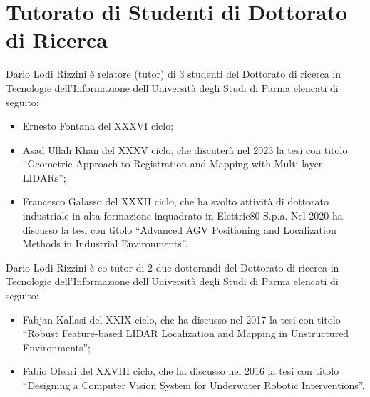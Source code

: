 \documentclass[11pt]{article}
\begin{document}
\section*{Tutorato di Studenti di Dottorato di Ricerca}

Dario Lodi Rizzini \`e relatore (tutor) di 3 studenti del Dottorato di ricerca in Tecnologie dell'Informazione dell'Universit\`a degli Studi di Parma elencati di seguito:
\begin{itemize}
\item Ernesto Fontana del XXXVI ciclo;
\item Asad Ullah Khan del XXXV ciclo, che discuterà nel 2023 la tesi con titolo ``Geometric Approach to Registration and Mapping with Multi-layer LIDARs'';
\item Francesco Galasso del XXXII ciclo, che ha svolto attivit\`a di dottorato industriale in alta formazione inquadrato in Elettric80 S.p.a. 
  Nel 2020 ha discusso la tesi con titolo ``Advanced AGV Positioning and Localization Methods in Industrial Environments''.
\end{itemize}
%
\vspace{3mm}
%
Dario Lodi Rizzini \`e co-tutor di 2 due dottorandi del Dottorato di ricerca in Tecnologie dell'Informazione dell'Universit\`a degli Studi di Parma elencati di seguito:
\begin{itemize}
\item Fabjan Kallasi del XXIX ciclo, che ha discusso nel 2017 la tesi con titolo ``Robust Feature-based LIDAR Localization and Mapping in Unstructured Environments'';
\item Fabio Oleari del XXVIII ciclo, che ha discusso nel 2016 la tesi con titolo ``Designing a Computer Vision System for Underwater Robotic Interventions''.
\end{itemize}

\end{document}
